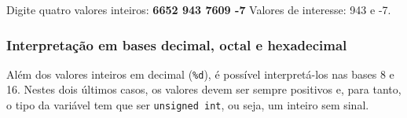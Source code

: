 \documentclass[
  11pt,
  a4paper,
]{scrbook}
\newenvironment{Shaded}{\begin{snugshade}}{\end{snugshade}}
\newcommand{\KeywordTok}[1]{\textcolor[rgb]{0.13,0.29,0.53}{\textbf{#1}}}
\newcommand{\NormalTok}[1]{#1}
\begin{document}
\begin{Shaded}
\begin{Highlighting}[]
\NormalTok{Digite quatro valores inteiros: }\KeywordTok{ 6652 943 7609 {-}7 }
\NormalTok{Valores de interesse: 943 e {-}7.}
\end{Highlighting}
\end{Shaded}

\subsubsection{Interpretação em bases decimal, octal e
hexadecimal}\label{interpretauxe7uxe3o-em-bases-decimal-octal-e-hexadecimal}

Além dos valores inteiros em decimal (\texttt{\%d}), é possível
interpretá-los nas bases 8 e 16. Nestes dois últimos casos, os valores
devem ser sempre positivos e, para tanto, o tipo da variável tem que ser
\texttt{unsigned\ int}, ou seja, um inteiro sem sinal.
\end{document}

